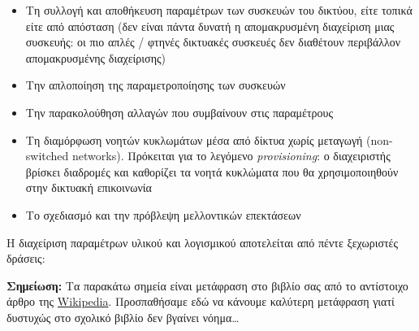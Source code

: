 \begin{itemize}
\item Τη συλλογή και αποθήκευση παραμέτρων των συσκευών του δικτύου, είτε τοπικά είτε από απόσταση (δεν είναι πάντα δυνατή η απομακρυσμένη διαχείριση μιας συσκευής: οι πιο απλές / φτηνές δικτυακές συσκευές δεν διαθέτουν περιβάλλον απομακρυσμένης διαχείρισης)
\item Την απλοποίηση της παραμετροποίησης των συσκευών
\item Την παρακολούθηση αλλαγών που συμβαίνουν στις παραμέτρους
\item Τη διαμόρφωση νοητών κυκλωμάτων μέσα από δίκτυα χωρίς μεταγωγή (non-switched networks). Πρόκειται για το λεγόμενο \emph{provisioning}: ο διαχειριστής βρίσκει διαδρομές και καθορίζει τα νοητά κυκλώματα που θα χρησιμοποιηθούν στην δικτυακή επικοινωνία
\item Το σχεδιασμό και την πρόβλεψη μελλοντικών επεκτάσεων
\end{itemize}

Η διαχείριση παραμέτρων υλικού και λογισμικού αποτελείται από πέντε ξεχωριστές δράσεις:

\begin{inthebox}
\textbf{Σημείωση:} Τα παρακάτω σημεία είναι μετάφραση στο βιβλίο σας από το αντίστοιχο άρθρο της \href{https://en.wikipedia.org/wiki/Configuration_management}{Wikipedia}. Προσπαθήσαμε εδώ να κάνουμε καλύτερη μετάφραση γιατί δυστυχώς στο σχολικό βιβλίο δεν βγαίνει νόημα\ldots\\
\end{inthebox}

